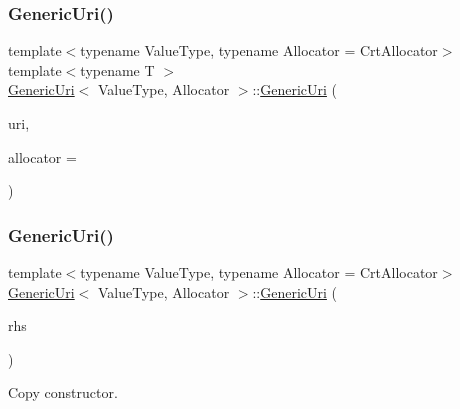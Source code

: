 \subsubsection{\texorpdfstring{Generic\+Uri()}{GenericUri()}\hspace{0.1cm}{\footnotesize\ttfamily [4/6]}}
{\footnotesize\ttfamily template$<$typename Value\+Type, typename Allocator = Crt\+Allocator$>$ \\
template$<$typename T $>$ \\
\hyperlink{classGenericUri}{Generic\+Uri}$<$ Value\+Type, Allocator $>$\+::\hyperlink{classGenericUri}{Generic\+Uri} (\begin{DoxyParamCaption}\item[{const T \&}]{uri,  }\item[{Allocator $\ast$}]{allocator = {} }\end{DoxyParamCaption})\hspace{0.3cm}{\ttfamily [inline]}}

\mbox{\label{classGenericUri_a701930adaab51f0da0b2fba64bb67b25}} 
\subsubsection{\texorpdfstring{Generic\+Uri()}{GenericUri()}\hspace{0.1cm}{\footnotesize\ttfamily [5/6]}}
{\footnotesize\ttfamily template$<$typename Value\+Type, typename Allocator = Crt\+Allocator$>$ \\
\hyperlink{classGenericUri}{Generic\+Uri}$<$ Value\+Type, Allocator $>$\+::\hyperlink{classGenericUri}{Generic\+Uri} (\begin{DoxyParamCaption}\item[{const \hyperlink{classGenericUri}{Generic\+Uri}$<$ Value\+Type, Allocator $>$ \&}]{rhs }\end{DoxyParamCaption})\hspace{0.3cm}{\ttfamily [inline]}}



Copy constructor. 

\mbox{\label{classGenericUri_a233ee45aeaeb5ee3a6ccea5a720d67b2}} 
